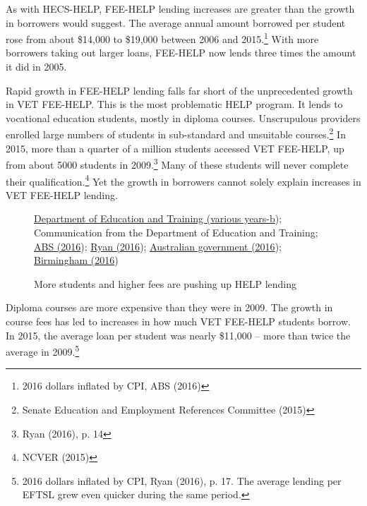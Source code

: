 \documentclass[embargoed]{grattan}
\begin{document}
As with HECS-HELP, FEE-HELP lending increases are greater than the growth in borrowers would suggest. The average annual amount borrowed per student rose from about \$14,000 to \$19,000 between 2006 and 2015.\footnote{2016 dollars inflated by CPI, ABS (2016)} With more borrowers taking out larger loans, FEE-HELP now lends three times the amount it did in 2005.

Rapid growth in FEE-HELP lending falls far short of the unprecedented growth in VET FEE-HELP. This is the most problematic HELP program. It lends to vocational education students, mostly in diploma courses. Unscrupulous providers enrolled large numbers of students in sub-standard and unsuitable courses.\footnote{Senate Education and Employment References Committee (2015)} In 2015, more than a quarter of a million students accessed VET FEE-HELP, up from about 5000 students in 2009.\footnote{Ryan (2016), p. 14} Many of these students will never complete their qualification.\footnote{NCVER (2015)} Yet the growth in borrowers cannot solely explain increases in VET FEE-HELP lending.

\begin{figure}
\caption{More students and higher fees are pushing up HELP lending}\label{fig:fig4-more-students-higher-fees-are-pushing-up-HELP-lending}

%
{\protect\hyperlink{_ENREF_36}{Department of Education and Training (various years-b}); Communication from the Department of Education and Training; \protect\hyperlink{_ENREF_6}{ABS (2016}); \protect\hyperlink{_ENREF_71}{Ryan (2016}); \protect\hyperlink{_ENREF_13}{Australian government (2016}); \protect\hyperlink{_ENREF_12}{Birmingham (2016})}
\end{figure}

Diploma courses are more expensive than they were in 2009. The growth in course fees has led to increases in how much VET FEE-HELP students borrow. In 2015, the average loan per student was nearly \$11,000 -- more than twice the average in 2009.\footnote{2016 dollars inflated by CPI, Ryan (2016), p. 17. The average lending per EFTSL grew even quicker during the same period.}
\end{document}

